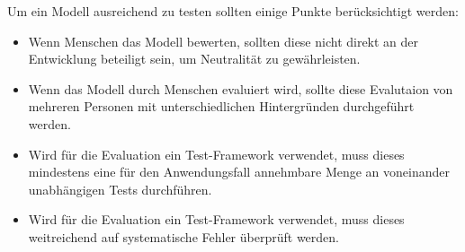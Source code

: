 \documentclass[12pt]{report}
\begin{document}
Um ein Modell ausreichend zu testen sollten einige Punkte berücksichtigt werden: %
\begin{itemize}
    \item Wenn Menschen das Modell bewerten, sollten diese nicht direkt an der Entwicklung beteiligt sein, um Neutralität zu gewährleisten.
    \item Wenn das Modell durch Menschen evaluiert wird, sollte diese Evalutaion von mehreren Personen mit unterschiedlichen Hintergründen durchgeführt werden.
    \item Wird für die Evaluation ein Test-Framework verwendet, muss dieses mindestens eine für den Anwendungsfall annehmbare Menge an voneinander unabhängigen Tests durchführen.
    \item Wird für die Evaluation ein Test-Framework verwendet, muss dieses weitreichend auf systematische Fehler überprüft werden.
\end{itemize}
\end{document}
